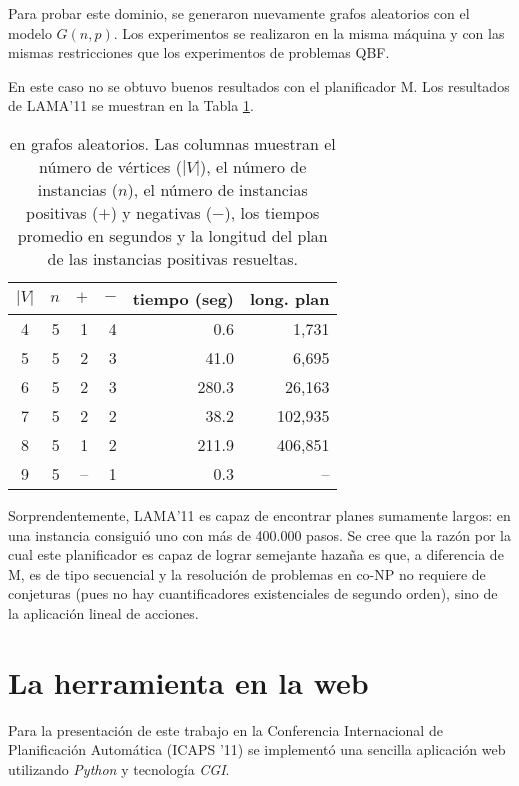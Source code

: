 Para probar este dominio, se generaron nuevamente grafos aleatorios con el modelo
$G(n,p)$. Los experimentos se realizaron en la misma máquina y con las
mismas restricciones que los experimentos de problemas QBF.

En este caso no se obtuvo buenos resultados con el planificador M.
Los resultados de LAMA'11 \citep{richter:lama} se muestran en la
Tabla \ref{table:exp:co-3col}.

\begin{table}[h!]
\centering
\begin{tabular}{crrrrr}
$|V|$ & $n$ & $+$ & $-$ &  tiempo (seg) & long. plan  \\
\midrule
    4 &   5 &   1 &   4 &   0.6 &   1,731  \\
    5 &   5 &   2 &   3 &  41.0 &   6,695  \\
    6 &   5 &   2 &   3 & 280.3 &  26,163  \\
    7 &   5 &   2 &   2 &  38.2 & 102,935  \\
    8 &   5 &   1 &   2 & 211.9 & 406,851  \\
    9 &   5 & -- &   1 &   0.3 &      -- \\
\end{tabular}
\caption[Resultados de LAMA'11 para \coCOL]{\small \coCOL en grafos aleatorios.
  Las columnas muestran el número de vértices ($|V|$), el número de instancias ($n$),
  el número de instancias positivas ($+$) y negativas ($-$), los tiempos
  promedio en segundos y la longitud del plan de las instancias positivas
  resueltas.
}
\label{table:exp:co-3col}
\end{table}

Sorprendentemente, LAMA'11 es capaz de encontrar planes sumamente largos: en
una instancia consiguió uno con más de 400.000 pasos. Se cree que la razón
por la cual este planificador es capaz de lograr semejante hazaña es que, a diferencia de M, 
es de tipo secuencial y la resolución de problemas en co-NP no requiere de
conjeturas (pues no hay cuantificadores existenciales de segundo orden), sino
de la aplicación lineal de acciones.

\section{La herramienta en la web}

Para la presentación de este trabajo en la Conferencia Internacional de
Planificación Automática (ICAPS '11) se implementó una sencilla aplicación web
utilizando \textit{Python} y tecnología \textit{CGI}.

